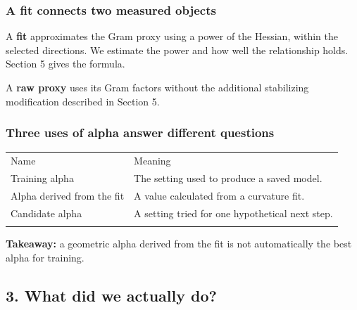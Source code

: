 \documentclass[
  14pt,
  letterpaper,
]{extarticle}
\newcounter{none} %
\let\reportsubsubsection\subsubsection
\renewcommand{\subsubsection}{\Needspace{5\baselineskip}\reportsubsubsection}
\begin{document}
\subsubsection{A fit connects two measured
objects}\label{a-fit-connects-two-measured-objects}

A \textbf{fit} approximates the Gram proxy using a power of the Hessian,
within the selected directions. We estimate the power and how well the
relationship holds. Section 5 gives the formula.

A \textbf{raw proxy} uses its Gram factors without the additional
stabilizing modification described in Section 5.

\subsubsection{Three uses of alpha answer different
questions}\label{three-uses-of-alpha-answer-different-questions}

{\def\LTcaptype{none} %
\begin{longtable}[]{@{}
  >{\raggedright\arraybackslash}p{}
  >{\raggedright\arraybackslash}p{}@{}}
\toprule\noalign{}
\begin{minipage}[b]{\linewidth}\raggedright
Name
\end{minipage} & \begin{minipage}[b]{\linewidth}\raggedright
Meaning
\end{minipage} \\*
\midrule\noalign{}
\endhead
\bottomrule\noalign{}
\endlastfoot
Training alpha & The setting used to produce a saved model. \\*
Alpha derived from the fit & A value calculated from a curvature fit. \\*
Candidate alpha & A setting tried for one hypothetical next step. \\*
\end{longtable}
}

\textbf{Takeaway:} a geometric alpha derived from the fit is not
automatically the best alpha for training.


\subsection{3. What did we actually do?}\label{what-did-we-actually-do}
\end{document}
